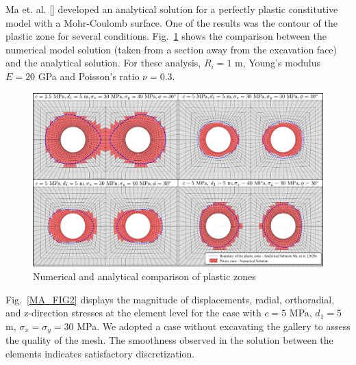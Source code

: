 \documentclass[a4paper,fleqn]{cas-sc}
\begin{document}
Ma et. al. [] developed an analytical solution for a perfectly plastic constitutive model with a Mohr-Coulomb surface. One of the results was the contour of the plastic zone for several conditions. Fig.~\ref{MA_FIG1} shows the comparison between the numerical model solution (taken from a section away from the excavation face) and the analytical solution. For these analysis, $R_i = 1$ m, Young's modulus $E=20$ GPa and Poisson's ratio $\nu = 0.3$.

\begin{figure}[h!]
	\centering
	\includegraphics[scale=0.7]{MA_FIG1.pdf}
	\caption{Numerical and analytical comparison of plastic zones}
	\label{MA_FIG1}
\end{figure}
\FloatBarrier

Fig.~\ref{MA_FIG2} displays the magnitude of displacements, radial, orthoradial, and z-direction stresses at the element level  for the case with $c=5$ MPa, $d_1=5$ m, $\sigma_x = \sigma_y = 30$ MPa. We adopted a case without excavating the gallery to assess the quality of the mesh. The smoothness observed in the solution between the elements indicates satisfactory discretization.
\end{document}
